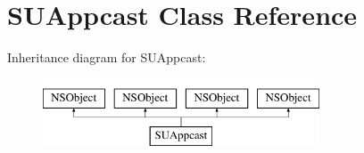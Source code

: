 \hypertarget{interface_s_u_appcast}{}\section{S\+U\+Appcast Class Reference}
\label{interface_s_u_appcast}
Inheritance diagram for S\+U\+Appcast\+:\begin{figure}[H]
\begin{center}
\leavevmode
\includegraphics[height=2.000000cm]{interface_s_u_appcast}
\end{center}
\end{figure}
